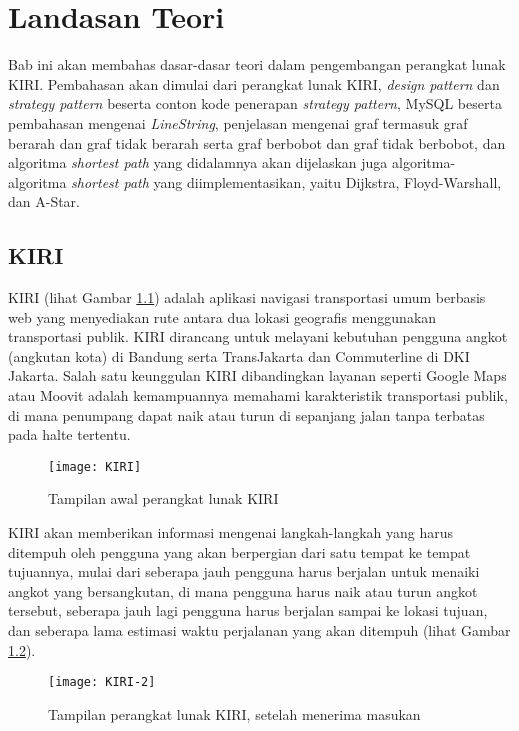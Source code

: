 \chapter{Landasan Teori}
\label{chap:teori}
Bab ini akan membahas dasar-dasar teori dalam pengembangan perangkat lunak KIRI. Pembahasan akan dimulai dari perangkat lunak KIRI, \textit{design pattern} dan \textit{strategy pattern} beserta conton kode penerapan \textit{strategy pattern}, MySQL beserta pembahasan mengenai \textit{LineString}, penjelasan mengenai graf termasuk graf berarah dan graf tidak berarah serta graf berbobot dan graf tidak berbobot, dan algoritma \textit{shortest path} yang didalamnya akan dijelaskan juga algoritma-algoritma \textit{shortest path} yang diimplementasikan, yaitu Dijkstra, Floyd-Warshall, dan A-Star.
\section{KIRI ~\cite{nugroho_natali:17:KIRI}}
\label{sec:kiri}
KIRI (lihat Gambar \ref{fig:tampilanawalkiri}) adalah aplikasi navigasi transportasi umum berbasis web yang menyediakan rute antara dua lokasi geografis menggunakan transportasi publik. KIRI dirancang untuk melayani kebutuhan pengguna angkot (angkutan kota) di Bandung serta TransJakarta dan Commuterline di DKI Jakarta. Salah satu keunggulan KIRI dibandingkan layanan seperti Google Maps atau Moovit adalah kemampuannya memahami karakteristik  transportasi publik, di mana penumpang dapat naik atau turun di sepanjang jalan tanpa terbatas pada halte tertentu.
\begin{figure}[H] 
	\centering  
	\texttt{[image: KIRI]}  
	\caption{Tampilan awal perangkat lunak KIRI}
	\label{fig:tampilanawalkiri} 
\end{figure}
\newpage
\noindent
KIRI akan memberikan informasi mengenai langkah-langkah yang harus ditempuh oleh pengguna yang akan berpergian dari satu tempat ke tempat tujuannya, mulai dari seberapa jauh pengguna harus berjalan untuk menaiki angkot yang bersangkutan, di mana pengguna harus naik atau turun angkot tersebut, seberapa jauh lagi pengguna harus berjalan sampai ke lokasi tujuan, dan seberapa lama estimasi waktu perjalanan yang akan ditempuh (lihat Gambar \ref{fig:tampilankiri}).
\begin{figure}[H] 
	\centering  
	\texttt{[image: KIRI-2]}  
	\caption{Tampilan perangkat lunak KIRI, setelah menerima masukan}
	\label{fig:tampilankiri} 
\end{figure}
